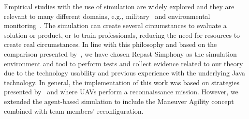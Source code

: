 Empirical studies with the use of simulation are widely explored and they are relevant to many different domains, e.g., \color{black}military~\citep{CC03} and \color{black}environmental monitoring~\citep{simulation001}. The simulation can create several circumstances to evaluate a solution or product, or to train professionals, reducing the need for resources to create real circumstances. In line with this philosophy and based on the comparison presented by~\citet{SIMUL01}, we have chosen Repast Simphony as the simulation environment and tool to perform tests and collect evidence related to our theory due to the technology usability and previous experience with the underlying Java technology. In general, the implementation of this work was based on strategies presented by~\citet{MAS07} and \citet{UAV01} where UAVs perform a reconnaissance mission. However, we extended the agent-based simulation to include the Maneuver Agility concept combined with team members' reconfiguration.

